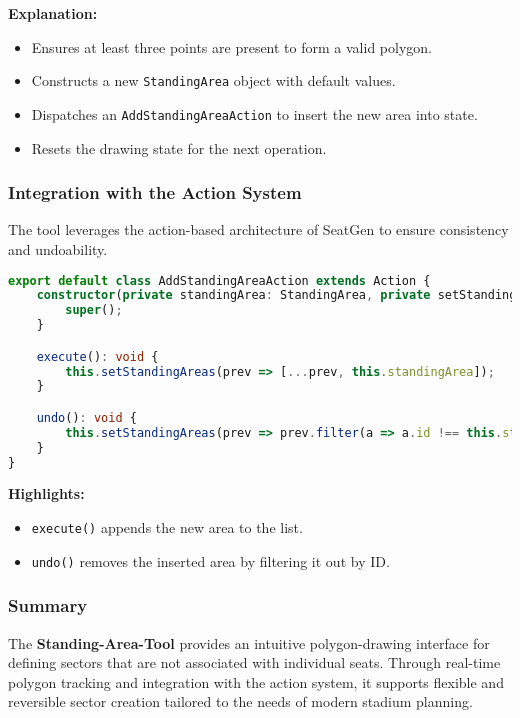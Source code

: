 \textbf{Explanation:}
\begin{itemize}
    \item Ensures at least three points are present to form a valid polygon.
    \item Constructs a new \texttt{StandingArea} object with default values.
    \item Dispatches an \texttt{AddStandingAreaAction} to insert the new area into state.
    \item Resets the drawing state for the next operation.
\end{itemize}

\subsubsection{Integration with the Action System}
The tool leverages the action-based architecture of SeatGen to ensure consistency and undoability.

\begin{lstlisting}[language=TypeScript, caption=AddStandingAreaAction, label=lst:add-standingarea-action]
export default class AddStandingAreaAction extends Action {
    constructor(private standingArea: StandingArea, private setStandingAreas: React.Dispatch<React.SetStateAction<StandingArea[]>>) {
        super();
    }

    execute(): void {
        this.setStandingAreas(prev => [...prev, this.standingArea]);
    }

    undo(): void {
        this.setStandingAreas(prev => prev.filter(a => a.id !== this.standingArea.id));
    }
}
\end{lstlisting}

\textbf{Highlights:}
\begin{itemize}
    \item \texttt{execute()} appends the new area to the list.
    \item \texttt{undo()} removes the inserted area by filtering it out by ID.
\end{itemize}

\subsubsection{Summary}
The \textbf{Standing-Area-Tool} provides an intuitive polygon-drawing interface for defining sectors that are not associated with individual seats. Through real-time polygon tracking and integration with the action system, it supports flexible and reversible sector creation tailored to the needs of modern stadium planning.
